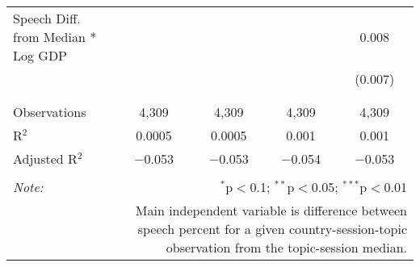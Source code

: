 \begin{table}[!htbp]
\begin{tabular}{@{\extracolsep{5pt}}lcccc}
 Speech Diff. from Median * Log GDP &  &  &  & 0.008 \\ 
  &  &  &  & (0.007) \\ 
  & & & & \\ 
\hline \\[-1.8ex] 
Observations & 4,309 & 4,309 & 4,309 & 4,309 \\ 
R$^{2}$ & 0.0005 & 0.0005 & 0.001 & 0.001 \\ 
Adjusted R$^{2}$ & $-$0.053 & $-$0.053 & $-$0.054 & $-$0.053 \\ 
\hline 
\hline \\[-1.8ex] 
\textit{Note:}  & \multicolumn{4}{r}{$^{*}$p$<$0.1; $^{**}$p$<$0.05; $^{***}$p$<$0.01} \\ 
 & \multicolumn{4}{r}{Main independent variable is difference between speech percent for a given country-session-topic observation from the topic-session median.} \\ 
\end{tabular} 
\end{table} 
